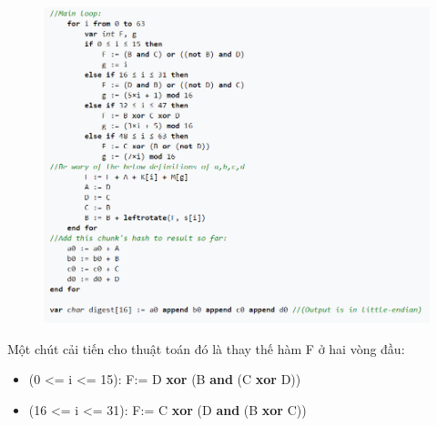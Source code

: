 \documentclass[../report.tex]{subfiles}
\begin{document}
\begin{figure}[H]
    \centering
    \includegraphics[width=\textwidth]{figures/al3.png}
\end{figure}

Một chút cải tiến cho thuật toán đó là thay thế hàm F ở hai vòng đầu:
\begin{itemize} 
    \item (0  <= i <= 15): F:= D \textbf{xor} (B \textbf{and} (C \textbf{xor} D))
    \item (16 <= i <= 31): F:= C \textbf{xor} (D \textbf{and} (B \textbf{xor} C))
\end{itemize}
\end{document}
